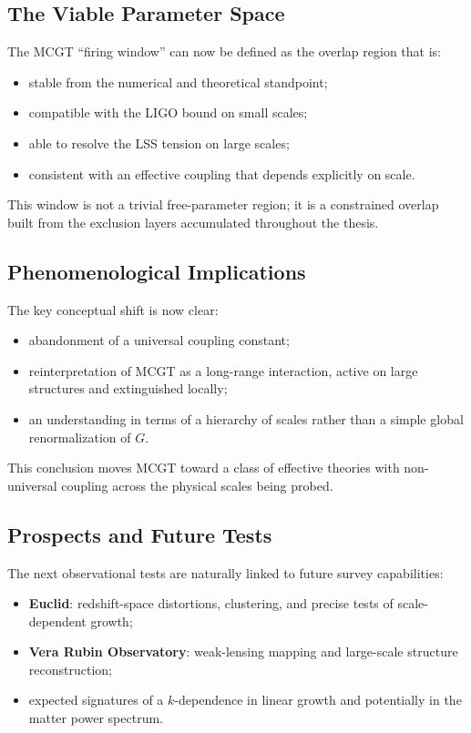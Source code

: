 \subsection{The Viable Parameter Space}
The MCGT ``firing window'' can now be defined as the overlap region that is:
\begin{itemize}
    \item stable from the numerical and theoretical standpoint;
    \item compatible with the LIGO bound on small scales;
    \item able to resolve the LSS tension on large scales;
    \item consistent with an effective coupling that depends explicitly on scale.
\end{itemize}

This window is not a trivial free-parameter region; it is a constrained overlap built from the exclusion layers accumulated throughout the thesis.

\subsection{Phenomenological Implications}
The key conceptual shift is now clear:
\begin{itemize}
    \item abandonment of a universal coupling constant;
    \item reinterpretation of MCGT as a long-range interaction, active on large structures and extinguished locally;
    \item an understanding in terms of a hierarchy of scales rather than a simple global renormalization of $G$.
\end{itemize}

This conclusion moves MCGT toward a class of effective theories with non-universal coupling across the physical scales being probed.

\subsection{Prospects and Future Tests}
The next observational tests are naturally linked to future survey capabilities:
\begin{itemize}
    \item \textbf{Euclid}: redshift-space distortions, clustering, and precise tests of scale-dependent growth;
    \item \textbf{Vera Rubin Observatory}: weak-lensing mapping and large-scale structure reconstruction;
    \item expected signatures of a $k$-dependence in linear growth and potentially in the matter power spectrum.
\end{itemize}

